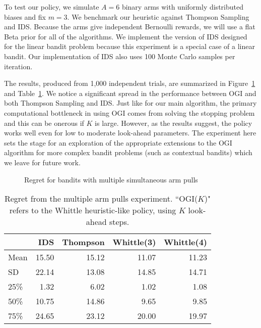 To test our policy, we simulate $A = 6$ binary arms with uniformly distributed biases and fix $m=3$. 
We benchmark our heuristic against Thompson Sampling and IDS. Because the arms give independent Bernoulli rewards, we will use a flat Beta prior for all of the algorithms. We implement the version of IDS designed for the linear bandit problem because this experiment is a special case of a linear bandit. Our implementation of IDS also uses 100 Monte Carlo samples per iteration.

The results, produced from 1,000 independent trials, are summarized in Figure~\ref{fig:restless1} and Table~\ref{table:restless1_summary}. We notice a significant spread in the performance between OGI and both Thompson Sampling and IDS. Just like for our main algorithm, the primary computational bottleneck in using OGI comes from solving the stopping problem and this can be onerous if $K$ is large. However, as the results suggest, the policy works well even for low to moderate look-ahead parameters. The experiment here sets the stage for an exploration of the appropriate extensions to the OGI algorithm for more complex bandit problems (such as contextual bandits) which we leave for future work. 

\begin{figure}
	\centering
	
	\caption{Regret for bandits with multiple simultaneous arm pulls}
	\label{fig:restless1}
\end{figure}

\begin{table}
	\centering
	\begin{tabular}{lrrrr}
		\toprule
		{} &   IDS &  Thompson &  Whittle(3) &  Whittle(4) \\
		\midrule
		Mean      & 15.50 &     15.12 &       11.07 &       11.23 \\
		SD       & 22.14 &     13.08 &       14.85 &       14.71 \\
		25\% &  1.32 &      6.02 &        1.02 &        1.08 \\
		50\%    & 10.75 &     14.86 &        9.65 &        9.85 \\
		75\% & 24.65 &     23.12 &       20.00 &       19.97 \\
		\bottomrule
	\end{tabular}
	
	\caption{Regret from the multiple arm pulls experiment. ``OGI($K$)" refers to the Whittle heuristic-like policy, using $K$ look-ahead steps.}
	\label{table:restless1_summary}
\end{table}
